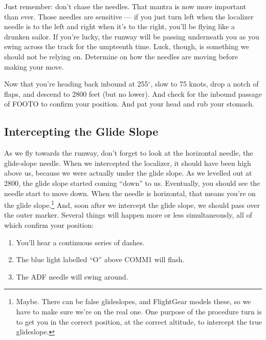 Just remember: don't chase the needles.  That mantra is now more
important than ever.  Those needles are sensitive --- if you just turn
left when the localizer needle is to the left and right when it's to
the right, you'll be flying like a drunken sailor.  If you're lucky,
the runway will be passing underneath you as you swing across the
track for the umpteenth time.  Luck, though, is something we should
not be relying on.  Determine on how the needles are moving before
making your move.

Now that you're heading back inbound at 255$^\circ$, slow to 75 knots,
drop a notch of flaps, and descend to 2800 feet (but no
lower).  And check for the inbound passage of FOOTO to
confirm your position.  And pat your head and rub your stomach.

\subsection{Intercepting the Glide Slope}

As we fly towards the runway, don't forget to look at the horizontal
needle, the glide-slope needle.  When we intercepted the localizer, it
should have been high above us, because we were actually under the
glide slope.  As we levelled out at 2800, the glide slope started
coming ``down'' to us.  Eventually, you should see the needle start to
move down.  When the needle is horizontal, that means you're on the
glide slope.\footnote{Maybe.  There can be false glideslopes, and
  FlightGear models these, so we have to make sure we're on the real
  one.  One purpose of the procedure turn is to get you in the correct
  position, at the correct altitude, to intercept the true
  glideslope.}  And, soon after we intercept the glide slope, we
should pass over the outer marker.  Several things will happen more or
less simultaneously, all of which confirm your position:





\begin{enumerate}
\item You'll hear a continuous series of dashes.
\item The blue light labelled ``O'' above COMM1 will flash.
\item The ADF needle will swing around.
\end{enumerate}

